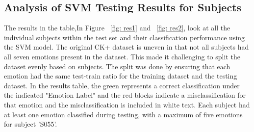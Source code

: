 \subsection{Analysis of SVM Testing Results for Subjects}
The results in the table,In Figure ~\ref{fig: res1} and ~\ref{fig: res2}, look at all the individual subjects within the test set and their classification performance using the SVM model. The original CK+ dataset is uneven in that not all subjects had all seven emotions present in the dataset. This made it challenging to split the dataset evenly based on subjects. The split was done by ensuring that each emotion had the same test-train ratio for the training dataset and the testing dataset. In the results table, the green represents a correct classification under the indicated "Emotion Label" and the red blocks indicate a misclassification for that emotion and the misclassification is included in white text. Each subject had at least one emotion classified during testing, with a maximum of five emotions for subject 'S055'. 

